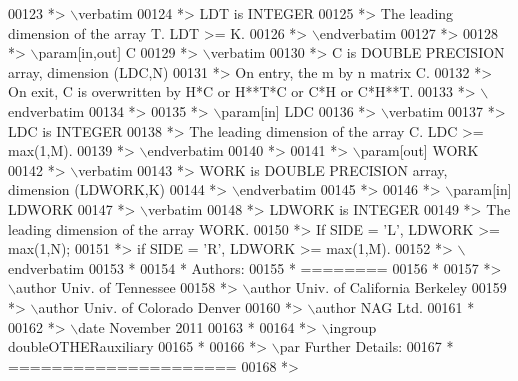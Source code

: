 \begin{DoxyCode}
00123 \textcolor{comment}{*> \(\backslash\)verbatim}
00124 \textcolor{comment}{*>          LDT is INTEGER}
00125 \textcolor{comment}{*>          The leading dimension of the array T. LDT >= K.}
00126 \textcolor{comment}{*> \(\backslash\)endverbatim}
00127 \textcolor{comment}{*>}
00128 \textcolor{comment}{*> \(\backslash\)param[in,out] C}
00129 \textcolor{comment}{*> \(\backslash\)verbatim}
00130 \textcolor{comment}{*>          C is DOUBLE PRECISION array, dimension (LDC,N)}
00131 \textcolor{comment}{*>          On entry, the m by n matrix C.}
00132 \textcolor{comment}{*>          On exit, C is overwritten by H*C or H**T*C or C*H or C*H**T.}
00133 \textcolor{comment}{*> \(\backslash\)endverbatim}
00134 \textcolor{comment}{*>}
00135 \textcolor{comment}{*> \(\backslash\)param[in] LDC}
00136 \textcolor{comment}{*> \(\backslash\)verbatim}
00137 \textcolor{comment}{*>          LDC is INTEGER}
00138 \textcolor{comment}{*>          The leading dimension of the array C. LDC >= max(1,M).}
00139 \textcolor{comment}{*> \(\backslash\)endverbatim}
00140 \textcolor{comment}{*>}
00141 \textcolor{comment}{*> \(\backslash\)param[out] WORK}
00142 \textcolor{comment}{*> \(\backslash\)verbatim}
00143 \textcolor{comment}{*>          WORK is DOUBLE PRECISION array, dimension (LDWORK,K)}
00144 \textcolor{comment}{*> \(\backslash\)endverbatim}
00145 \textcolor{comment}{*>}
00146 \textcolor{comment}{*> \(\backslash\)param[in] LDWORK}
00147 \textcolor{comment}{*> \(\backslash\)verbatim}
00148 \textcolor{comment}{*>          LDWORK is INTEGER}
00149 \textcolor{comment}{*>          The leading dimension of the array WORK.}
00150 \textcolor{comment}{*>          If SIDE = 'L', LDWORK >= max(1,N);}
00151 \textcolor{comment}{*>          if SIDE = 'R', LDWORK >= max(1,M).}
00152 \textcolor{comment}{*> \(\backslash\)endverbatim}
00153 \textcolor{comment}{*}
00154 \textcolor{comment}{*  Authors:}
00155 \textcolor{comment}{*  ========}
00156 \textcolor{comment}{*}
00157 \textcolor{comment}{*> \(\backslash\)author Univ. of Tennessee }
00158 \textcolor{comment}{*> \(\backslash\)author Univ. of California Berkeley }
00159 \textcolor{comment}{*> \(\backslash\)author Univ. of Colorado Denver }
00160 \textcolor{comment}{*> \(\backslash\)author NAG Ltd. }
00161 \textcolor{comment}{*}
00162 \textcolor{comment}{*> \(\backslash\)date November 2011}
00163 \textcolor{comment}{*}
00164 \textcolor{comment}{*> \(\backslash\)ingroup doubleOTHERauxiliary}
00165 \textcolor{comment}{*}
00166 \textcolor{comment}{*> \(\backslash\)par Further Details:}
00167 \textcolor{comment}{*  =====================}
00168 \textcolor{comment}{*>}

\end{DoxyCode}
